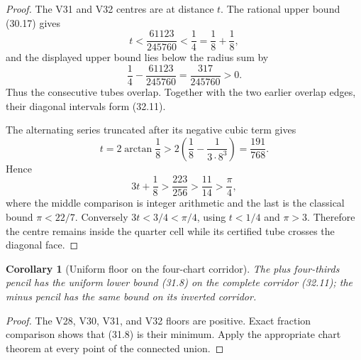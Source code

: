 \documentclass[11pt,oneside]{article}
\newtheorem{corollary}[theorem]{Corollary}
\theoremstyle{definition}
\theoremstyle{remark}
\begin{document}
\begin{proof}
The V31 and V32 centres are at distance \(t\).  The rational upper
bound (30.17) gives
\[
 t<\frac{61123}{245760}<\frac14=\frac18+\frac18,
\]
and the displayed upper bound lies below the radius sum by
\[
 \frac14-\frac{61123}{245760}
 =\frac{317}{245760}>0.                                \tag{32.12}
\]
Thus the consecutive tubes overlap.  Together with the two earlier
overlap edges, their diagonal intervals form (32.11).

The alternating series truncated after its negative cubic term
gives
\[
 t=2\arctan\frac18
 >2\left(\frac18-\frac1{3\cdot8^3}\right)
 =\frac{191}{768}.                                     \tag{32.13}
\]
Hence
\[
 3t+\frac18>\frac{223}{256}>
 \frac{11}{14}>\frac{\pi}{4},                          \tag{32.14}
\]
where the middle comparison is integer arithmetic and the last is
the classical bound \(\pi<22/7\).  Conversely
\(3t<3/4<\pi/4\), using \(t<1/4\) and \(\pi>3\).
Therefore the centre remains inside the quarter cell while its
certified tube crosses the diagonal face.
\end{proof}

\begin{corollary}[Uniform floor on the four-chart corridor]
\label{cor:newv32-corridor-floor}
The plus four-thirds pencil has the uniform lower bound (31.8) on
the complete corridor (32.11); the minus pencil has the same bound
on its inverted corridor.
\end{corollary}

\begin{proof}
The V28, V30, V31, and V32 floors are positive.  Exact fraction
comparison shows that (31.8) is their minimum.  Apply the appropriate
chart theorem at every point of the connected union.
\end{proof}
\end{document}
